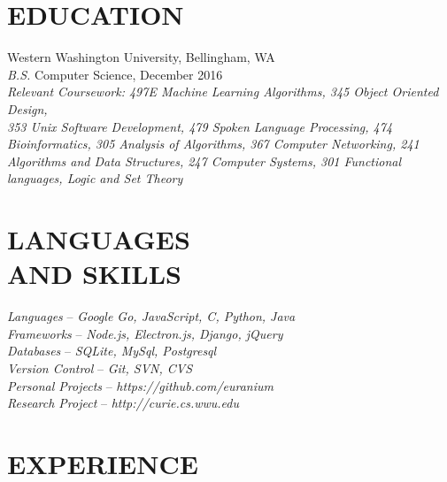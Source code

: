 \documentclass[line,margin]{res}
\begin{document}
\address{360.931.3237 $|$ rainierharvey@gmail.com $|$ nulldev.ninja $|$ github.com/euranium}

\begin{resume}

\section{EDUCATION}
	{\sf Western Washington University}, Bellingham, WA \\
	{\sl B.S.} Computer Science, { December 2016} \\
	{\sl Relevant Coursework: 497E {Machine Learning Algorithms}, 345 {Object Oriented Design},\\
		353 {Unix Software Development}, 479 {Spoken Language Processing}, 474 {Bioinformatics},
		305 {Analysis of Algorithms}, 367 {Computer Networking},
		241 {Algorithms and Data Structures}, 247 {Computer Systems},
		301 {Functional languages, Logic and Set Theory}}

\section{LANGUAGES\\AND SKILLS}
	{\sl Languages} -- {\sl Google Go, JavaScript, C, Python, Java}\\
	{\sl Frameworks} -- {\sl Node.js, Electron.js, Django, jQuery} \\
	{\sl Databases} -- {\sl SQLite, MySql, Postgresql} \\
	{\sl Version Control} -- {\sl Git, SVN, CVS}\\
	{\sl Personal Projects} -- {\sl https://github.com/euranium}\\
	{\sl Research Project} -- {\sl http://curie.cs.wwu.edu}\\

\section{EXPERIENCE}


\end{resume}
\end{document}
